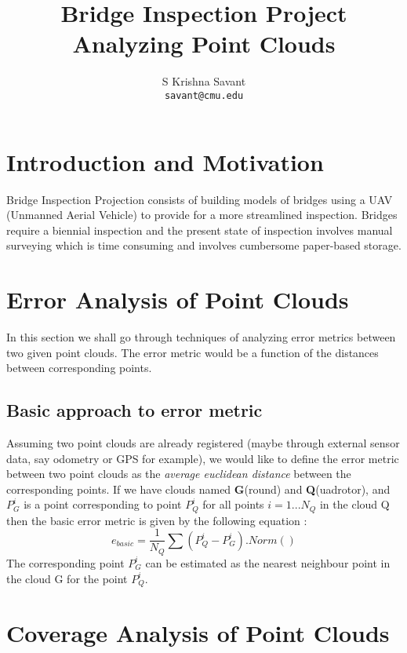\documentclass[notitlepage]{article}
\title{Bridge Inspection Project\\[1cm]\textbf{Analyzing Point Clouds}\\[1cm]}
\author{S Krishna Savant\\
        \texttt{savant@cmu.edu}\\
        }
\begin{document}
\maketitle

\tableofcontents

\pagebreak

\section{Introduction and Motivation}
Bridge Inspection Projection consists of building models of bridges using a UAV (Unmanned Aerial Vehicle) to provide for a more streamlined inspection. 
Bridges require a biennial inspection and the present state of inspection involves manual surveying which is time consuming and involves cumbersome paper-based storage.

\section{Error Analysis of Point Clouds}
    In this section we shall go through techniques of analyzing error metrics between two given point clouds.
    The error metric would be a function of the distances between corresponding points.
    \subsection{Basic approach to error metric}
    Assuming two point clouds are already registered (maybe through external sensor data, say odometry or GPS for example), we would like to define the error metric between two point clouds as the \emph{average euclidean distance} between the corresponding points.
    If we have clouds named \textbf{G}(round) and \textbf{Q}(uadrotor), and $P_{G}^{i}$ is a point corresponding to point $P_Q^i$ for all points $i=1...N_Q$ in the cloud Q then the basic error metric is given by the following equation :
    $$ e_{basic} = \frac{1}{N_Q} \sum (P_Q^{i}-P_G^i).Norm()$$
    The corresponding point $P_G^i$ can be estimated as the nearest neighbour point in the cloud G for the point $P_Q^i$.

\section{Coverage Analysis of Point Clouds}
\end{document}
